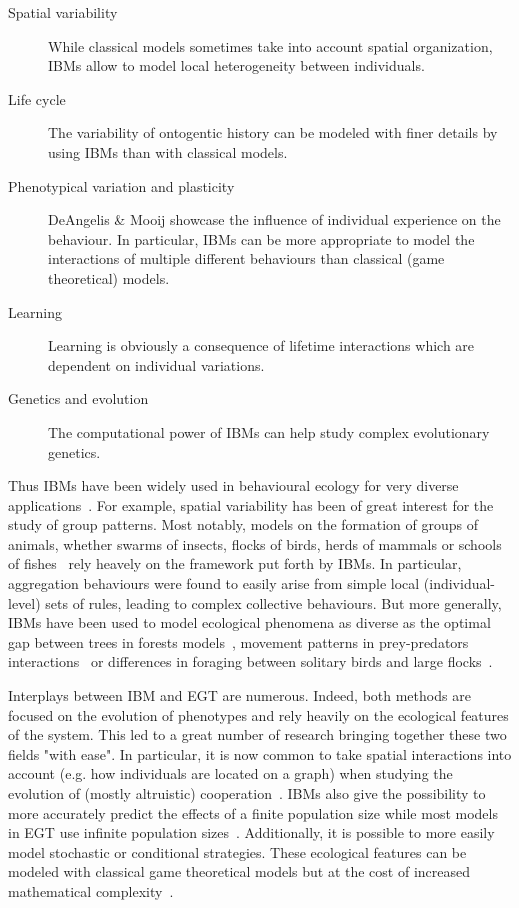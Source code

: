     \begin{description}
        \item[Spatial variability] {While classical models sometimes take into account spatial organization, IBMs allow to model local heterogeneity between individuals.}
        \item[Life cycle] {The variability of ontogentic history can be modeled with finer details by using IBMs than with classical models.}
        \item[Phenotypical variation and plasticity] {DeAngelis \& Mooij showcase the influence of individual experience on the behaviour. In particular, IBMs can be more appropriate to model the interactions of multiple different behaviours than classical (game theoretical) models.}
        \item[Learning] {Learning is obviously a consequence of lifetime interactions which are dependent on individual variations.}
        \item[Genetics and evolution] {The computational power of IBMs can help study complex evolutionary genetics.}
    \end{description}

    Thus IBMs have been widely used in behavioural ecology for very diverse applications~\parencite{DeAngelis2005}. For example, spatial variability has been of great interest for the study of group patterns. Most notably, models on the formation of groups of animals, whether swarms of insects, flocks of birds, herds of mammals or schools of fishes~\parencite{Huth1992, Reynolds1992, Gueron1996, Couzin2002} rely heavely on the framework put forth by IBMs. In particular, aggregation behaviours were found to easily arise from simple local (individual-level) sets of rules, leading to complex collective behaviours. But more generally, IBMs have been used to model ecological phenomena as diverse as the optimal gap between trees in forests models~\parencite{Botkin1972}, movement patterns in prey-predators interactions~\parencite{Smith1991} or differences in foraging between solitary birds and large flocks~\parencite{Toquenaga1995}.


    Interplays between IBM and EGT are numerous. Indeed, both methods are focused on the evolution of phenotypes and rely heavily on the ecological features of the system. This led to a great number of research bringing together these two fields "with ease". In particular, it is now common to take spatial interactions into account (e.g. how individuals are located on a graph) when studying the evolution of (mostly altruistic) cooperation~\parencite{Hauert2004}. IBMs also give the possibility to more accurately predict the effects of a finite population size while most models in EGT use infinite population sizes~\parencite{Hauert2009}. Additionally, it is possible to more easily model stochastic or conditional strategies. These ecological features can be modeled with classical game theoretical models but at the cost of increased mathematical complexity~\parencite{Hauert2009}. 

